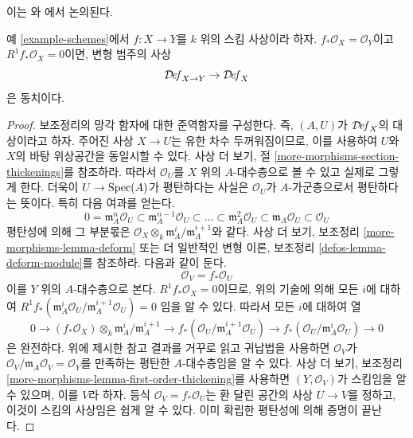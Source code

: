 \begin{lemma}
\label{lemma-schemes-morphisms-smooth-to-base}
\begin{reference}
이는 \cite[5.3절]{Ravi-Murphys-Law}와
\cite[정리 3.3]{Ran-deformations}에서 논의된다.
\end{reference}
예 \ref{example-schemes}에서 $f : X \to Y$를 $k$ 위의 스킴 사상이라
하자.%
$f_*\mathcal{O}_X = \mathcal{O}_Y$이고 $R^1f_*\mathcal{O}_X = 0$이면,
변형 범주의 사상
$$
\mathcal{D}\!\mathit{ef}_{X \to Y} \to \mathcal{D}\!\mathit{ef}_X
$$
은 동치이다.
\end{lemma}

\begin{proof}
보조정리의 망각 함자에 대한 준역함자를 구성한다. 즉, $(A, U)$가
$\mathcal{D}\!\mathit{ef}_X$의 대상이라고 하자. 주어진 사상 $X \to U$는
유한 차수 두꺼워짐이므로, 이를 사용하여 $U$와 $X$의 바탕 위상공간을
동일시할 수 있다. 사상 더 보기, 절
\ref{more-morphisms-section-thickenings}를 참조하라. 따라서
$\mathcal{O}_U$를 $X$ 위의 $A$-대수층으로 볼 수 있고 실제로 그렇게 한다.
더욱이 $U \to \mathop{\mathrm{Spec}}(A)$가 평탄하다는 사실은 $\mathcal{O}_U$가
$A$-가군층으로서 평탄하다는 뜻이다. 특히 다음 여과를 얻는다.
$$
0 = \mathfrak m_A^n\mathcal{O}_U \subset
\mathfrak m_A^{n - 1}\mathcal{O}_U \subset \ldots \subset
\mathfrak m_A^2\mathcal{O}_U \subset
\mathfrak m_A\mathcal{O}_U \subset \mathcal{O}_U
$$
평탄성에 의해 그 부분몫은
$\mathcal{O}_X \otimes_k \mathfrak m_A^i/\mathfrak m_A^{i + 1}$와 같다.
사상 더 보기, 보조정리 \ref{more-morphisms-lemma-deform} 또는 더 일반적인
변형 이론, 보조정리 \ref{defos-lemma-deform-module}를 참조하라. 다음과
같이 둔다.
$$
\mathcal{O}_V = f_*\mathcal{O}_U
$$
이를 $Y$ 위의 $A$-대수층으로 본다. $R^1f_*\mathcal{O}_X = 0$이므로,
위의 기술에 의해 모든 $i$에 대하여
$R^1f_*(\mathfrak m_A^i\mathcal{O}_U/\mathfrak m_A^{i + 1}\mathcal{O}_U) = 0$
임을 알 수 있다. 따라서 모든 $i$에 대하여 열
$$
0 \to
(f_*\mathcal{O}_X) \otimes_k \mathfrak m_A^i/\mathfrak m_A^{i + 1} \to
f_*(\mathcal{O}_U/\mathfrak m_A^{i + 1}\mathcal{O}_U) \to
f_*(\mathcal{O}_U/\mathfrak m_A^i\mathcal{O}_U) \to 0
$$
은 완전하다. 위에 제시한 참고 결과를 거꾸로 읽고 귀납법을 사용하면
$\mathcal{O}_V$가 $\mathcal{O}_V/\mathfrak m_A\mathcal{O}_V =
\mathcal{O}_Y$를 만족하는 평탄한 $A$-대수층임을 알 수 있다. 사상 더 보기,
보조정리 \ref{more-morphisms-lemma-first-order-thickening}를 사용하면
$(Y, \mathcal{O}_V)$가 스킴임을 알 수 있으며, 이를 $V$라 하자. 등식
$\mathcal{O}_V = f_*\mathcal{O}_U$는 환 달린 공간의 사상 $U \to V$를
정하고, 이것이 스킴의 사상임은 쉽게 알 수 있다. 이미 확립한 평탄성에
의해 증명이 끝난다.
\end{proof}







